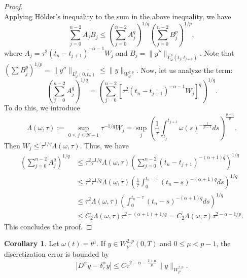 \documentclass[12pt,a4paper]{article}
\theoremstyle{definition}
\newtheorem{corollary}{Corollary}
\begin{document}
\begin{proof}
\begin{equation}
\end{equation}
Applying H\"older's inequality to the sum in the above inequality, we have
\begin{equation}
    \sum_{j=0}^{n-2} A_j B_j \le \left( \sum_{j=0}^{n-2} A_j^q \right)^{1/q} \left( \sum_{j=0}^{n-2} B_j^p \right)^{1/p},
\end{equation}
where $A_j =\tau^2 (t_n - t_{j+1})^{-\alpha-1} W_j$ and $B_j = \|y''\|_{L^p_\omega(t_j, t_{j+1})}$. Note that $(\sum B_j^p)^{1/p} = \|y''\|_{L^p_\omega(0,t_n)} \le \|y\|_{W^{2,p}_\omega}$. Now, let us analyze the term:
\begin{equation}
    \left( \sum_{j=0}^{n-2} A_j^q \right)^{1/q} = \left( \sum_{j=0}^{n-2} \left[ \tau^2 (t_n - t_{j+1})^{-\alpha-1} W_j \right]^q \right)^{1/q}.
\end{equation}
To do this, we introduce
\begin{equation}
    \Lambda(\omega, \tau) := \sup_{0 \le j \le N-1} \tau^{-1/q} W_j = \sup_{j} \left( \frac{1}{\tau} \int_{t_j}^{t_{j+1}} \omega(s)^{-\frac{1}{p-1}} ds \right)^{\frac{p-1}{p}}.
\end{equation}
Then $W_j \le \tau^{1/q} \Lambda(\omega, \tau)$. Thus, we have
\begin{align}
    \left( \sum_{j=0}^{n-2} A_j^q \right)^{1/q} &\le \tau^2 \tau^{1/q} \Lambda(\omega, \tau) \left( \sum_{j=0}^{n-2} (t_n - t_{j+1})^{-(\alpha+1)q} \right)^{1/q} \nonumber \\
    &\le \tau^2 \tau^{1/q} \Lambda(\omega, \tau) \left( \frac{1}{\tau} \int_0^{t_n-\tau} (t_n - s)^{-(\alpha+1)q} ds \right)^{1/q} \nonumber \\
    &\le \tau^2 \Lambda(\omega, \tau) \left( \int_0^{t_n-\tau} (t_n - s)^{-(\alpha+1)q} ds \right)^{1/q} \nonumber \\
    &\le C_2 \Lambda(\omega, \tau) \tau^{2-(\alpha+1) + 1/q} = C_2 \Lambda(\omega, \tau) \tau^{2-\alpha-1/p}.
\end{align}
This concludes the proof.
\end{proof}
\begin{corollary}\label{cor1}
    Let $\omega(t) = t^\mu$. If $y \in W^{2,p}_{t^\mu}(0,T)$ and $0 \le \mu < p-1$, the discretization error is bounded by
    \begin{equation}
        |D^\alpha y - \delta_\tau^\alpha y| \le C \tau^{2 - \alpha - \frac{1+\mu}{p}} \|y\|_{W^{2,p}_{t^\mu}}.
    \end{equation}
\end{corollary}
\end{document}
